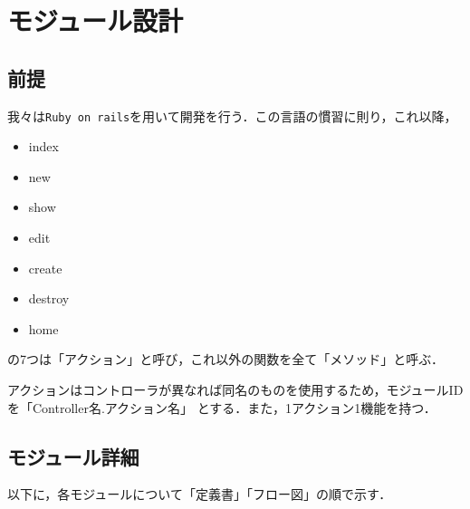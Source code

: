 \chapter{モジュール設計}
\section{前提}
我々は\texttt{Ruby on rails}を用いて開発を行う．この言語の慣習に則り，これ以降，
\begin{itemize}
    \item index
    \item new
    \item show
    \item edit
    \item create
    \item destroy
    \item home
\end{itemize}
の7つは「アクション」と呼び，これ以外の関数を全て「メソッド」と呼ぶ．\par
アクションはコントローラが異なれば同名のものを使用するため，モジュールIDを「Controller名.アクション名」
とする．また，1アクション1機能を持つ．

\section{モジュール詳細}
以下に，各モジュールについて「定義書」「フロー図」の順で示す．


